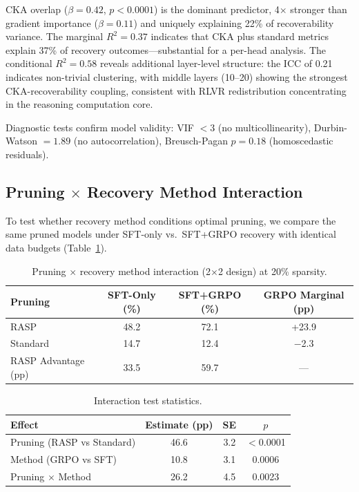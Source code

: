 \documentclass[11pt]{article}
\begin{document}
CKA overlap ($\beta = 0.42$, $p < 0.0001$) is the dominant predictor, 4$\times$ stronger than gradient importance ($\beta = 0.11$) and uniquely explaining 22\% of recoverability variance.
The marginal $R^2 = 0.37$ indicates that CKA plus standard metrics explain 37\% of recovery outcomes---substantial for a per-head analysis.
The conditional $R^2 = 0.58$ reveals additional layer-level structure: the ICC of 0.21 indicates non-trivial clustering, with middle layers (10--20) showing the strongest CKA-recoverability coupling, consistent with RLVR redistribution concentrating in the reasoning computation core.

Diagnostic tests confirm model validity: VIF $< 3$ (no multicollinearity), Durbin-Watson $= 1.89$ (no autocorrelation), Breusch-Pagan $p = 0.18$ (homoscedastic residuals).


\subsection{Pruning $\times$ Recovery Method Interaction}
\label{sec:interaction}

To test whether recovery method conditions optimal pruning, we compare the same pruned models under SFT-only vs.\ SFT+GRPO recovery with identical data budgets (Table~\ref{tab:interaction}).

\begin{table}[t]
\centering
\caption{Pruning $\times$ recovery method interaction (2$\times$2 design) at 20\% sparsity.}
\label{tab:interaction}
\begin{tabular}{lccc}
\toprule
\textbf{Pruning} & \textbf{SFT-Only (\%)} & \textbf{SFT+GRPO (\%)} & \textbf{GRPO Marginal (pp)} \\
\midrule
RASP     & 48.2 & 72.1 & +23.9 \\
Standard & 14.7 & 12.4 & $-$2.3 \\
\midrule
RASP Advantage (pp) & 33.5 & 59.7 & --- \\
\bottomrule
\end{tabular}
\end{table}

\begin{table}[t]
\centering
\caption{Interaction test statistics.}
\label{tab:interaction_stats}
\begin{tabular}{lccc}
\toprule
\textbf{Effect} & \textbf{Estimate (pp)} & \textbf{SE} & \textbf{$p$} \\
\midrule
Pruning (RASP vs Standard) & 46.6 & 3.2 & $<$0.0001 \\
Method (GRPO vs SFT) & 10.8 & 3.1 & 0.0006 \\
Pruning $\times$ Method & 26.2 & 4.5 & 0.0023 \\
\bottomrule
\end{tabular}
\end{table}
\end{document}
